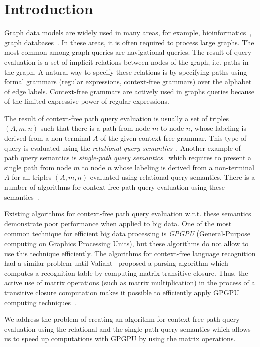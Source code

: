 \section{Introduction}
Graph data models are widely used in many areas, for example, bioinformatics~\cite{Bio}, graph databases~\cite{graphDB}. In these areas, it is often required to process large graphs. The most common among graph queries are navigational queries. The result of query evaluation is a set of implicit relations between nodes of the graph, i.e. paths in the graph. A natural way to specify these relations is by specifying paths using formal grammars (regular expressions, context-free grammars) over the alphabet of edge labels. Context-free grammars are actively used in graphs queries because of the limited expressive power of regular expressions. 

The result of context-free path query evaluation is usually a set of triples $(A, m, n)$ such that there is a path from node $m$ to node $n$, whose labeling is derived from a non-terminal $A$ of the given context-free grammar. This type of query is evaluated using the \textit{relational query semantics}~\cite{hellingsRelational}. Another example of path query semantics is \textit{single-path query semantics}~\cite{hellingsPathQuerying} which requires to present a single path from node $m$ to node $n$ whose labeling is derived from a non-terminal $A$ for all triples $(A, m, n)$ evaluated using relational query semantics. There is a number of algorithms for context-free path query evaluation using these semantics~\cite{GLL, hellingsRelational, RDF}.

Existing algorithms for context-free path query evaluation w.r.t. these semantics demonstrate poor performance when applied to big data. One of the most common technique for efficient big data processing is \textit{GPGPU} (General-Purpose computing on Graphics Processing Units), but these algorithms do not allow to use this technique efficiently. The algorithms for context-free language recognition had a similar problem until Valiant~\cite{valiant} proposed a parsing algorithm which computes a recognition table by computing matrix transitive closure. Thus, the active use of matrix operations (such as matrix multiplication) in the process of a transitive closure computation makes it possible to efficiently apply GPGPU computing techniques~\cite{matricesOnGPGPU}.

We address the problem of creating an algorithm for context-free path query evaluation using the relational and the single-path query semantics which allows us to speed up computations with GPGPU by using the matrix operations.

